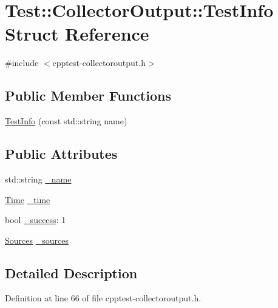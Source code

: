 \hypertarget{struct_test_1_1_collector_output_1_1_test_info}{}\section{Test\+:\+:Collector\+Output\+:\+:Test\+Info Struct Reference}
\label{struct_test_1_1_collector_output_1_1_test_info}


{\ttfamily \#include $<$cpptest-\/collectoroutput.\+h$>$}

\subsection*{Public Member Functions}
\begin{DoxyCompactItemize}
\item 
\mbox{\hyperlink{struct_test_1_1_collector_output_1_1_test_info_acfd49728d424c2824effe37beb85de87}{Test\+Info}} (const std\+::string name)
\end{DoxyCompactItemize}
\subsection*{Public Attributes}
\begin{DoxyCompactItemize}
\item 
std\+::string \mbox{\hyperlink{struct_test_1_1_collector_output_1_1_test_info_aa28d98e3ea65b4dda28fbb8c62817cf5}{\+\_\+name}}
\item 
\mbox{\hyperlink{class_test_1_1_time}{Time}} \mbox{\hyperlink{struct_test_1_1_collector_output_1_1_test_info_a59094663d5e7e2a7d896ce574ae6ef1b}{\+\_\+time}}
\item 
bool \mbox{\hyperlink{struct_test_1_1_collector_output_1_1_test_info_a99a6450e62566587a15c9ae9b7073ae7}{\+\_\+success}}\+: 1
\item 
\mbox{\hyperlink{class_test_1_1_collector_output_a1921f35e0da596bd75da5824afe872c9}{Sources}} \mbox{\hyperlink{struct_test_1_1_collector_output_1_1_test_info_a930eb868ea4e8fb30577967179c80d77}{\+\_\+sources}}
\end{DoxyCompactItemize}


\subsection{Detailed Description}


Definition at line 66 of file cpptest-\/collectoroutput.\+h.



